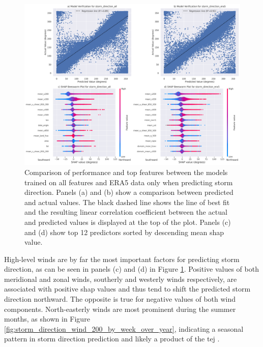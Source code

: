 \begin{figure}[ht]
    \centering
    \includegraphics[width=\textwidth]{../figures/generated/experiments/storm_direction/storm_direction_summary.png}
    \caption{Comparison of performance and top features between the models trained on all features and ERA5 data only when predicting storm direction. Panels (a) and (b) show a comparison between predicted and actual values. The black dashed line shows the line of best fit and the resulting linear correlation coefficient between the actual and predicted values is displayed at the top of the plot. Panels (c) and (d) show top 12 predictors sorted by descending mean \acrshort{shap} value.}
    \label{fig:storm_direction_summary}
\end{figure}

High-level winds are by far the most important factors for predicting storm direction, as can be seen in panels (c) and (d) in Figure \ref{fig:storm_direction_summary}. Positive values of both meridional and zonal winds, southerly and westerly winds respectively, are associated with positive \acrshort{shap} values and thus tend to shift the predicted storm direction northward. The opposite is true for negative values of both wind components. North-easterly winds are most prominent during the summer months, as shown in Figure \ref{fig:storm_direction_wind_200_by_week_over_year}, indicating a seasonal pattern in storm direction prediction and likely a product of the \acrfull{tej} \citep{Vashisht2021}.


